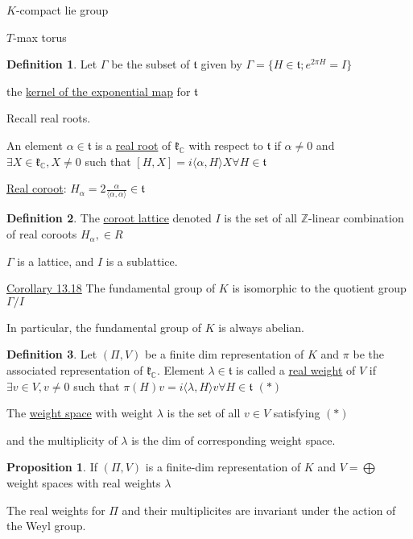 \documentclass{article}
\theoremstyle{definition}
\newtheorem{definition}{Definition}
\newtheorem{proposition}{Proposition}
\begin{document}
\(K\)-compact lie group

\(T\)-max torus

\begin{definition}
    Let \(\Gamma \) be the subset of \(\mathfrak{t}\) given by \(\Gamma = \{ H \in \mathfrak{t} ; e^{2\pi H} = I \} \)
    
    the \underline{kernel of the exponential map} for \(\mathfrak{t}\)
\end{definition}

Recall real roots.

An element \(\alpha \in \mathfrak{t}\) is a \underline{real root} of \(\mathfrak{k}_\mathbb{C}\) with respect to \(\mathfrak{t}\) if \(\alpha \neq 0\) and \(\exists X\in \mathfrak{k}_\mathbb{C},X \neq 0\) such that \([H,X] = i \langle \alpha , H \rangle X \forall H\in \mathfrak{t} \)      

\underline{Real coroot}: \(H_\alpha = 2 \frac{\alpha}{\langle \alpha ,\alpha \rangle }\in \mathfrak{t}\) 

\begin{definition}
    The \underline{coroot lattice} denoted \(I\) is the set of all \(\mathbb{Z}\)-linear combination of real coroots \(H_\alpha, \in R\)   
\end{definition}

\(\Gamma\) is a lattice, and \(I\) is a sublattice.

\underline{Corollary 13.18} The fundamental group of \(K\) is isomorphic to the quotient group \(\Gamma / I\)

In particular, the fundamental group of \(K\) is always abelian.

\begin{definition}
    Let \((\Pi, V)\) be a finite dim representation of \(K\) and \(\pi\) be the associated representation of \(\mathfrak{k}_\mathbb{C}\). Element \(\lambda \in \mathfrak{t}\) is called a \underline{real weight} of \(V\) if \(\exists v\in V, v\neq 0\) such that \(\pi(H)v = i \langle \lambda , H \rangle v \forall H\in \mathfrak{t} \) \((\ast)\)
    
    The \underline{weight space} with weight \(\lambda\) is the set of all \(v\in V\) satisfying \((\ast)\) 
    
    and the multiplicity of \(\lambda\) is the dim of corresponding weight space. 
\end{definition}

\begin{proposition}
    If \((\Pi, V)\) is a finite-dim representation of \(K\) and \(V = \bigoplus\) weight spaces with real weights \(\lambda\)
    
    The real weights for \(\Pi\) and their multiplicites are invariant under the action of the Weyl group.
\end{proposition}
\end{document}
